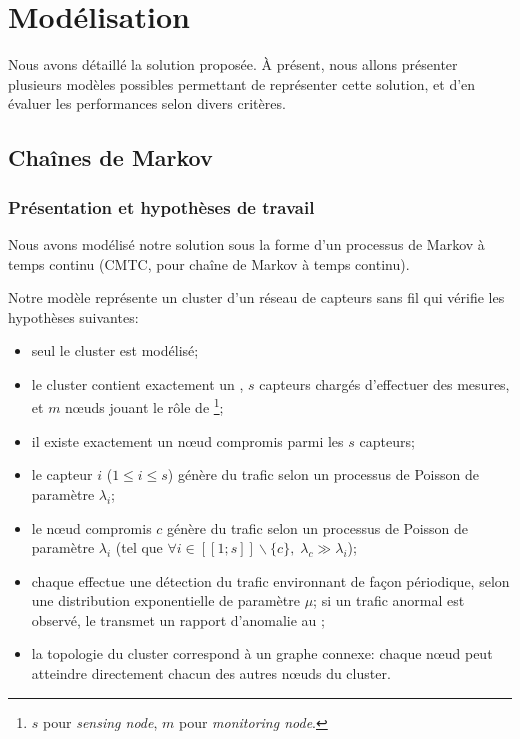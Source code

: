 \section{Modélisation}
\label{sa:sec:modelisation}

Nous avons détaillé la solution proposée. À présent, nous allons présenter plusieurs modèles possibles permettant de représenter cette solution, et d'en évaluer les performances selon divers critères.

    \subsection{Chaînes de Markov}

        \subsubsection{Présentation et hypothèses de travail}
Nous avons modélisé notre solution sous la forme d'un processus de Markov à temps continu (CMTC, pour chaîne de Markov à temps continu).

Notre modèle représente un cluster d'un réseau de capteurs sans fil qui vérifie les hypothèses suivantes:
\begin{itemize}
    \item seul le cluster est modélisé;
    \item le cluster contient exactement un \CH, $s$ capteurs chargés d'effectuer des mesures, et $m$ nœuds jouant le rôle de \cns\footnote{$s$ pour \textit{sensing node}, $m$ pour \textit{monitoring node}.};
    \item il existe exactement un nœud compromis parmi les $s$ capteurs;
    \item le capteur $i$ ($1 \leq i \leq s$) génère du trafic selon un processus de Poisson de paramètre $\lambda_i$;
    \item le nœud compromis $c$ génère du trafic selon un processus de Poisson de paramètre $\lambda_i$ (tel que $\forall i\in[\![1;s]\!]\backslash\{c\},\; \lambda_c\gg\lambda_i$);
    \item chaque \cn effectue une détection du trafic environnant de façon périodique, selon une distribution exponentielle de paramètre $\mu$; si un trafic anormal est observé, le \cn transmet un rapport d'anomalie au \CH;
    \item la topologie du cluster correspond à un graphe connexe: chaque nœud peut atteindre directement chacun des autres nœuds du cluster.
\end{itemize}

